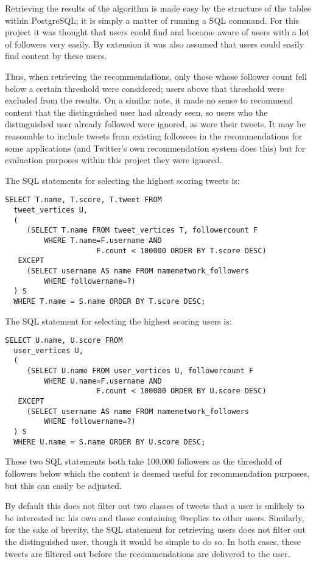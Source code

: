 Retrieving the results of the algorithm is made easy by the structure of the tables within PostgreSQL; it is simply a matter of running a SQL command. For this project it was thought that users could find and become aware of users with a lot of followers very easily. By extension it was also assumed that users could easily find content by these users.

Thus, when retrieving the recommendations, only those whose follower count fell below a certain threshold were considered; users above that threshold were excluded from the results. On a similar note, it made no sense to recommend content that the distinguished user had already seen, so users who the distinguished user already followed were ignored, as were their tweets. It may be reasonable to include tweets from existing followees in the recommendations for some applications (and Twitter's own recommendation system does this) but for evaluation purposes within this project they were ignored.

The SQL statements for selecting the highest scoring tweets is:

\begin{verbatim}
SELECT T.name, T.score, T.tweet FROM
  tweet_vertices U,
  (
     (SELECT T.name FROM tweet_vertices T, followercount F
         WHERE T.name=F.username AND
                     F.count < 100000 ORDER BY T.score DESC)
   EXCEPT
     (SELECT username AS name FROM namenetwork_followers
         WHERE followername=?)
  ) S
  WHERE T.name = S.name ORDER BY T.score DESC;
\end{verbatim}

\noindent
The SQL statement for selecting the highest scoring users is:

\begin{verbatim}
SELECT U.name, U.score FROM
  user_vertices U,
  (
     (SELECT U.name FROM user_vertices U, followercount F
         WHERE U.name=F.username AND
                     F.count < 100000 ORDER BY U.score DESC)
   EXCEPT
     (SELECT username AS name FROM namenetwork_followers
         WHERE followername=?)
  ) S
  WHERE U.name = S.name ORDER BY U.score DESC;
\end{verbatim}

\noindent
These two SQL statements both take 100,000 followers as the threshold of followers below which the content is deemed useful for recommendation purposes, but this can easily be adjusted.

By default this does not filter out two classes of tweets that a user is unlikely to be interested in: his own and those containing @replies to other users. Similarly, for the sake of brevity, the SQL statement for retrieving users does not filter out the distinguished user, though it would be simple to do so. In both cases, these tweets are filtered out before the recommendations are delivered to the user.




